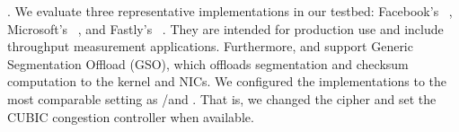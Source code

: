 \textbf{\quic}.
We evaluate three representative \quic implementations in our testbed:
Facebook's \mvfst~\cite{mvfst-github,Joras_mvfst}, Microsoft's
\msquic~\cite{msquic-github}, and Fastly's \quicly~\cite{quicly-github}. They
are intended for production use and include throughput measurement applications.
Furthermore, \mvfst and \quicly support Generic Segmentation Offload (GSO),
which offloads \udp segmentation and checksum computation to the kernel and NICs.
We configured the \quic implementations to the most comparable setting as
\tls/\tcp and \tcpls. That is, we changed the cipher and set the CUBIC
congestion controller when available.

